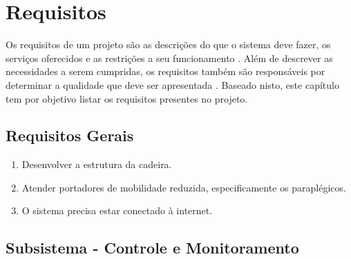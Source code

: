 \chapter{Requisitos}

Os requisitos de um projeto são as descrições do que o sistema deve fazer, os
serviços oferecidos e as restrições a seu funcionamento \cite{sommerville}.
Além de descrever as necessidades a serem cumpridas, os requisitos também são
responsáveis por determinar a qualidade que deve ser apresentada \cite{robertson}.
Baseado nisto, este capítulo tem por objetivo listar os requisitos presentes
no projeto.

\section{Requisitos Gerais}

\begin{enumerate}
  \item Desenvolver a estrutura da cadeira.
  \item Atender portadores de mobilidade reduzida, especificamente os paraplégicos.
  \item O sistema precisa estar conectado à internet.
\end{enumerate}

\section{Subsistema - Controle e Monitoramento}


